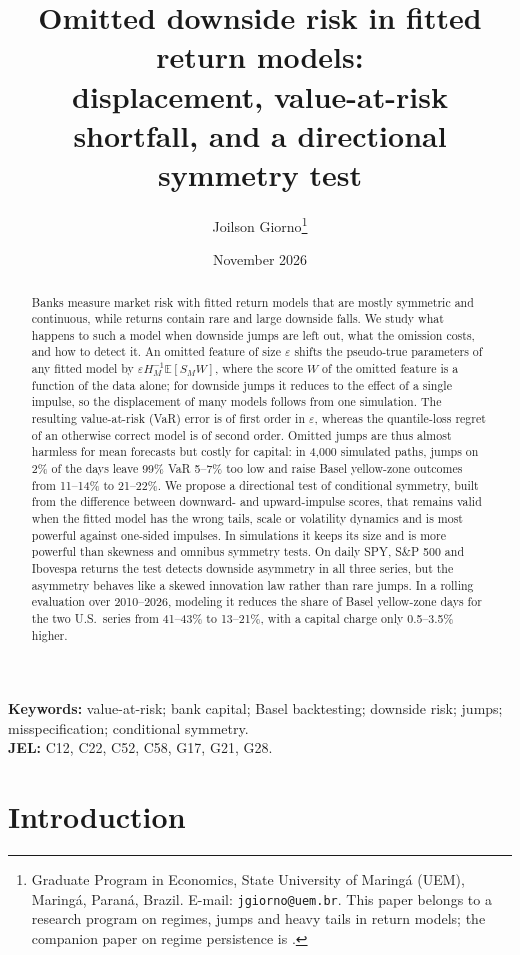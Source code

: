 \documentclass[11pt,a4paper]{article}
\title{Omitted downside risk in fitted return models:\\ displacement, value-at-risk shortfall, and a directional symmetry test}
\author{Joilson Giorno\thanks{Graduate Program in Economics, State University of Maring\'a (UEM), Maring\'a, Paran\'a, Brazil. E-mail: \texttt{jgiorno@uem.br}. This paper belongs to a research program on regimes, jumps and heavy tails in return models; the companion paper on regime persistence is \citet{giornoA}.}}
\date{November 2026}
\theoremstyle{definition}
\theoremstyle{remark}
\newcommand{\E}{\mathbb{E}}
\begin{document}
\maketitle

\begin{abstract}
Banks measure market risk with fitted return models that are mostly symmetric and continuous, while returns contain rare and large downside falls. We study what happens to such a model when downside jumps are left out, what the omission costs, and how to detect it. An omitted feature of size $\varepsilon$ shifts the pseudo-true parameters of any fitted model by $\varepsilon H_M^{-1}\E[S_MW]$, where the score $W$ of the omitted feature is a function of the data alone; for downside jumps it reduces to the effect of a single impulse, so the displacement of many models follows from one simulation. The resulting value-at-risk (VaR) error is of first order in $\varepsilon$, whereas the quantile-loss regret of an otherwise correct model is of second order. Omitted jumps are thus almost harmless for mean forecasts but costly for capital: in 4{,}000 simulated paths, jumps on 2\% of the days leave 99\% VaR 5--7\% too low and raise Basel yellow-zone outcomes from 11--14\% to 21--22\%. We propose a directional test of conditional symmetry, built from the difference between downward- and upward-impulse scores, that remains valid when the fitted model has the wrong tails, scale or volatility dynamics and is most powerful against one-sided impulses. In simulations it keeps its size and is more powerful than skewness and omnibus symmetry tests. On daily SPY, S\&P 500 and Ibovespa returns the test detects downside asymmetry in all three series, but the asymmetry behaves like a skewed innovation law rather than rare jumps. In a rolling evaluation over 2010--2026, modeling it reduces the share of Basel yellow-zone days for the two U.S.\ series from 41--43\% to 13--21\%, with a capital charge only 0.5--3.5\% higher.
\end{abstract}

\noindent\textbf{Keywords:} value-at-risk; bank capital; Basel backtesting; downside risk; jumps; misspecification; conditional symmetry.\\
\textbf{JEL:} C12, C22, C52, C58, G17, G21, G28.

\section{Introduction}\label{sec:intro}
\end{document}
